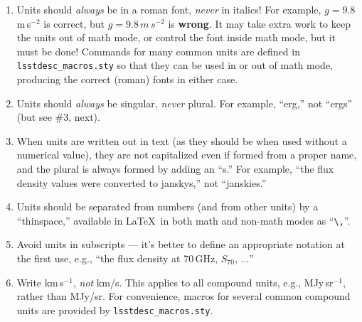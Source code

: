 \documentclass[letterpaper,11pt]{article}
\begin{document}
\begin{enumerate}

\item Units should {\it always\/} be in a roman font, {\it never\/} in
italics!  For example, $g = 9.8$\,m\,s$^{-2}$ is correct,
but $g=9.8\,m\,s^{-2}$ is
{\bf wrong}.  It may take extra work to keep the units out of math mode, or
control the font inside math mode, but it must be done!  Commands for many
common units are defined in {\tt lsstdesc\_macros.sty} so that they can be used in or out of
math mode, producing the correct (roman) fonts in either case.

\item Units should {\it always\/} be singular, {\it never\/} plural.  For
example, ``erg,'' not ``ergs'' (but see \#3, next).

\item When units are written out in text (as they should be when used without
a numerical value), they are not capitalized even if formed from a proper name,
and the plural is always formed by adding an ``s.''  For example, ``the flux
density values were converted to janskys,''  not ``janskies.''



\item Units should be separated from numbers (and from other units) by a
``thinspace,'' available in La\TeX\ in both math and non-math modes as
``\verb|\,|''.

\item Avoid units in subscripts --- it's better to define an appropriate
notation at the first use, e.g., ``the flux density at 70\,GHz,
$S_{70}$, $\ldots$''

\item Write km\,s$^{-1}$, {\it not\/} km/s.  This applies to all compound
units, e.g., MJy\,sr$^{-1}$, rather than MJy/sr. For convenience, macros for several common compound units are provided by {\tt lsstdesc\_macros.sty}.


\end{enumerate}
\end{document}
